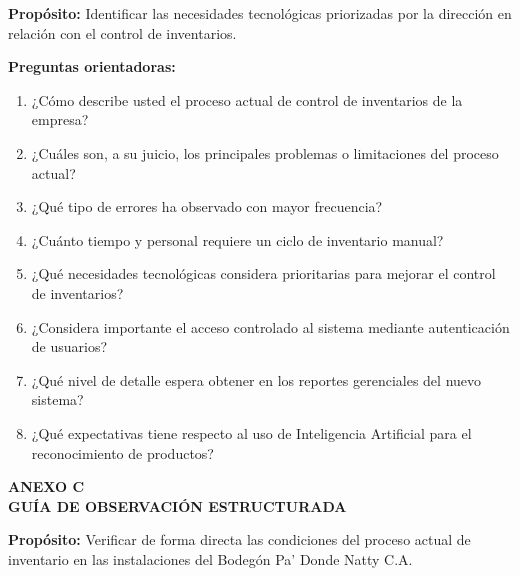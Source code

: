 \documentclass[12pt, letterpaper]{report}
\begin{document}
\textbf{Propósito:} Identificar las necesidades tecnológicas
priorizadas por la dirección en relación con el control de
inventarios.

\vspace{8pt}

\textbf{Preguntas orientadoras:}

\begin{enumerate}[leftmargin=*]
\item ¿Cómo describe usted el proceso actual de control de
      inventarios de la empresa?
\item ¿Cuáles son, a su juicio, los principales problemas o
      limitaciones del proceso actual?
\item ¿Qué tipo de errores ha observado con mayor frecuencia?
\item ¿Cuánto tiempo y personal requiere un ciclo de inventario
      manual?
\item ¿Qué necesidades tecnológicas considera prioritarias para
      mejorar el control de inventarios?
\item ¿Considera importante el acceso controlado al sistema mediante
      autenticación de usuarios?
\item ¿Qué nivel de detalle espera obtener en los reportes
      gerenciales del nuevo sistema?
\item ¿Qué expectativas tiene respecto al uso de Inteligencia
      Artificial para el reconocimiento de productos?
\end{enumerate}

\clearpage
\begin{center}
{\fontsize{14}{16}\selectfont\bfseries
ANEXO C\\
GUÍA DE OBSERVACIÓN ESTRUCTURADA\par}
\end{center}
\vspace{12pt}

\textbf{Propósito:} Verificar de forma directa las condiciones del
proceso actual de inventario en las instalaciones del Bodegón Pa'
Donde Natty C.A.

\vspace{8pt}
\end{document}
